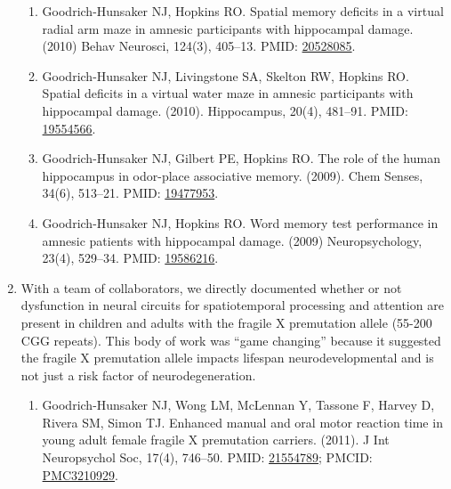 \documentclass{nihbiosketch}
\begin{document}
\begin{enumerate}
	      \begin{enumerate}
	      	
	      	\item Goodrich-Hunsaker NJ, Hopkins RO. Spatial memory deficits in a virtual radial arm maze in amnesic participants with hippocampal damage. (2010) Behav Neurosci, 124(3), 405--13. PMID: \href{https:/pubmed.gov/20528085}{20528085}. 
	      	      
	      	\item Goodrich-Hunsaker NJ, Livingstone SA, Skelton RW, Hopkins RO. Spatial deficits in a virtual water maze in amnesic participants with hippocampal damage. (2010). Hippocampus, 20(4), 481--91. PMID: \href{https:/pubmed.gov/19554566}{19554566}. 
	      	      
	      	\item Goodrich-Hunsaker NJ, Gilbert PE, Hopkins RO. The role of the human hippocampus in odor-place associative memory. (2009). Chem Senses, 34(6), 513--21. PMID: \href{https:/pubmed.gov/19477953}{19477953}.
	      	
	      	\item Goodrich-Hunsaker NJ, Hopkins RO. Word memory test performance in amnesic patients with hippocampal damage. (2009) Neuropsychology, 23(4), 529--34. PMID: \href{https:/pubmed.gov/19586216}{19586216}. 
	      	      
	      \end{enumerate}
	      
	\item With a team of collaborators, we directly documented whether or not dysfunction in neural circuits for spatiotemporal processing and attention are present in children and adults with the fragile X premutation allele (55-200 CGG repeats). This body of work was “game changing” because it suggested the fragile X premutation allele impacts lifespan neurodevelopmental and is not just a risk factor of neurodegeneration.
	      
	      \begin{enumerate}   
	      	
	      	\item Goodrich-Hunsaker NJ, Wong LM, McLennan Y, Tassone F, Harvey D, Rivera SM, Simon TJ. Enhanced manual and oral motor reaction time in young adult female fragile X premutation carriers. (2011). J Int Neuropsychol Soc, 17(4), 746--50. PMID: \href{https:/pubmed.gov/21554789}{21554789}; PMCID: \href{https://www.ncbi.nlm.nih.gov/pmc/articles/PMC3210929}{PMC3210929}. 
	      	      

\end{enumerate}
\end{enumerate}
\end{document}
